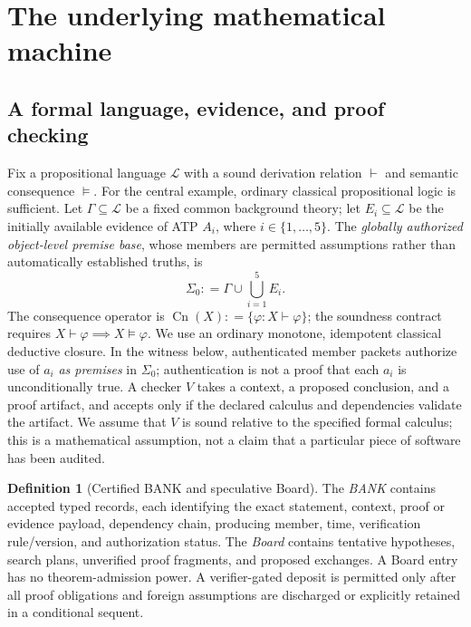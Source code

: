 \documentclass[11pt,letterpaper]{article}
\theoremstyle{definition}
\newtheorem{definition}[theorem]{Definition}
\theoremstyle{remark}
\newcommand{\Cn}{\operatorname{Cn}}
\newcommand{\defeq}{\mathrel{\mathop:}=}
\begin{document}
\section{The underlying mathematical machine}
\subsection{A formal language, evidence, and proof checking}
Fix a propositional language $\mathcal L$ with a sound derivation relation $\vdash$ and semantic consequence $\models$. For the central example, ordinary classical propositional logic is sufficient. Let $\Gamma\subseteq\mathcal L$ be a fixed common background theory; let $E_i\subseteq\mathcal L$ be the initially available evidence of ATP $A_i$, where $i\in\{1,\dots,5\}$. The \emph{globally authorized object-level premise base}, whose members are permitted assumptions rather than automatically established truths, is
\begin{equation}\label{eq:base}
\Sigma_0\defeq\Gamma\cup\bigcup_{i=1}^5 E_i.
\end{equation}
The consequence operator is $\Cn(X)\defeq\{\varphi:X\vdash\varphi\}$; the soundness contract requires $X\vdash\varphi\implies X\models\varphi$. We use an ordinary monotone, idempotent classical deductive closure. In the witness below, authenticated member packets authorize use of $a_i$ \emph{as premises} in $\Sigma_0$; authentication is not a proof that each $a_i$ is unconditionally true. A checker $V$ takes a context, a proposed conclusion, and a proof artifact, and accepts only if the declared calculus and dependencies validate the artifact. We assume that $V$ is sound relative to the specified formal calculus; this is a mathematical assumption, not a claim that a particular piece of software has been audited.

\begin{definition}[Certified BANK and speculative Board]
The \emph{BANK} contains accepted typed records, each identifying the exact statement, context, proof or evidence payload, dependency chain, producing member, time, verification rule/version, and authorization status. The \emph{Board} contains tentative hypotheses, search plans, unverified proof fragments, and proposed exchanges. A Board entry has no theorem-admission power. A verifier-gated deposit is permitted only after all proof obligations and foreign assumptions are discharged or explicitly retained in a conditional sequent.
\end{definition}
\end{document}
